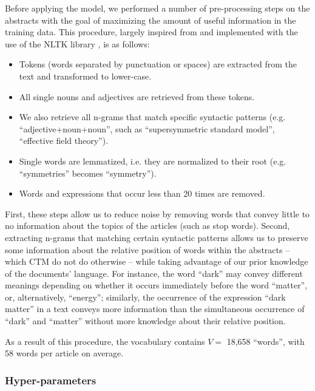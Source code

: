 \documentclass[smallextended]{svjour3}
\begin{document}
Before applying the model, we performed a number of pre-processing steps on the abstracts with the goal of maximizing the amount of useful information in the training data. This procedure, largely inspired from \citealt{omodei_tel-01097702} and implemented with the use of the NLTK library \citep{nltk}, is as follows:

\begin{itemize}
    \item Tokens (words separated by punctuation or spaces) are extracted from the text and transformed to lower-case.
    \item All single nouns and adjectives are retrieved from these tokens.
    \item We also retrieve all n-grams that match specific syntactic patterns (e.g. ``adjective+noun+noun'', such as ``supersymmetric standard model'', ``effective field theory'').
    \item Single words are lemmatized, i.e. they are normalized to their root (e.g. ``symmetries'' becomes ``symmetry'').
    \item Words and expressions that occur less than 20 times are removed.
\end{itemize}

First, these steps allow us to reduce noise by removing words that convey little to no information about the topics of the articles (such as stop words). Second, extracting n-grams that matching certain syntactic patterns allows us to preserve some information about the relative position of words within the abstracts -- which CTM do not do otherwise -- while taking advantage of our prior knowledge of the documents' language. For instance, the word ``dark'' may convey different meanings depending on whether it occurs immediately before the word ``matter'', or, alternatively, ``energy''; similarly, the occurrence of the expression ``dark matter'' in a text conveys more information than the simultaneous occurrence of ``dark'' and ``matter'' without more knowledge about their relative position.

As a result of this procedure, the vocabulary contains $V=$ 18,658 ``words'', with 58 words per article on average.

\subsubsection{\label{appendix:hyper_parameter}Hyper-parameters}
\end{document}
